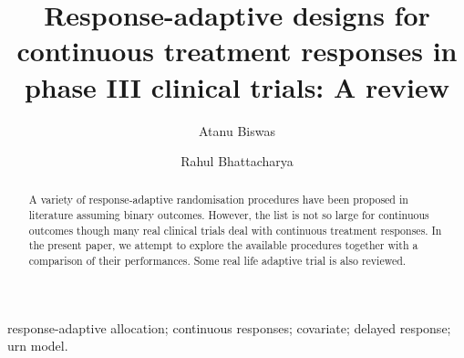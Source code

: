 

\begin{frontmatter}


\title{Response-adaptive designs for continuous treatment responses in phase III clinical trials: A review}



\newcommand{\artinfo}{\sffamily\fontsize{7pt}{8pt}\selectfont%
Statistical Methods in Medical Research\\
2015, Vol. 00(0) 00-00\\
\copyright\,The Author(s) 2014\\
Reprints and permission:\\ 
sagepub.co.uk/journalsPermissions.nav\\
DOI: 10.1177/0000000000000000\\
smm.sagepub.com\\
\texttt{[image: SAGE\_Logo.eps]}
}



\author{Atanu Biswas%
}
\author{Rahul Bhattacharya%
}




\begin{abstract}
A variety of response-adaptive randomisation procedures have been proposed in literature assuming binary outcomes. However, the list is not so large for continuous outcomes though many real clinical trials deal with
continuous treatment responses. In the present paper, we attempt to explore the available procedures together with a comparison of their performances. Some real life adaptive trial is also reviewed.
\end{abstract}

\begin{keyword}
response-adaptive allocation; continuous responses; covariate; delayed response; urn model.
\end{keyword}

\end{frontmatter}


